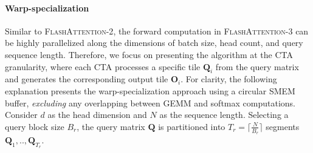 \paragraph{Warp-specialization}
Similar to \textsc{FlashAttention-2}, the forward computation in \textsc{FlashAttention-3} can be highly parallelized along the dimensions of batch size, head count, and query sequence length. Therefore, we focus on presenting the algorithm at the CTA granularity, where each CTA processes a specific tile $\mathbf{Q}_i$ from the query matrix and generates the corresponding output tile $\mathbf{O}_i$. For clarity, the following explanation presents the warp-specialization approach using a circular SMEM buffer, \emph{excluding} any overlapping between GEMM and softmax computations. Consider $d$ as the head dimension and $N$ as the sequence length. Selecting a query block size $B_r$, the query matrix $\mathbf{Q}$ is partitioned into $T_r = \lceil \frac{N}{B_r} \rceil$ segments $\mathbf{Q}_1, .., \mathbf{Q}_{T_r}$.

